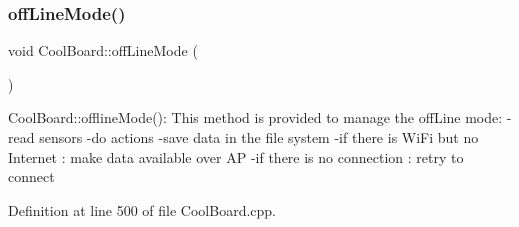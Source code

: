 \subsubsection{\texorpdfstring{off\+Line\+Mode()}{offLineMode()}}
{\footnotesize\ttfamily void Cool\+Board\+::off\+Line\+Mode (\begin{DoxyParamCaption}{ }\end{DoxyParamCaption})}

Cool\+Board\+::offline\+Mode()\+: This method is provided to manage the off\+Line mode\+: -\/read sensors -\/do actions -\/save data in the file system -\/if there is Wi\+Fi but no Internet \+: make data available over AP -\/if there is no connection \+: retry to connect 

Definition at line 500 of file Cool\+Board.\+cpp.


